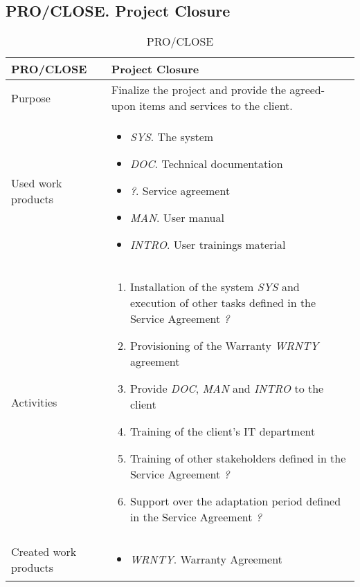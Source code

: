 \subsection{PRO/CLOSE. Project Closure}
\begin{table}[h]
\begin{tabular}{l|p{}}
\hline
\textbf{PRO/CLOSE}               & \textbf{Project Closure} \\ \hline
Purpose & Finalize the project and provide the agreed-upon items and services to the client.\\ \hline
Used work products    &      
\begin{itemize}
    \item \textit{SYS}. The system
    \item \textit{DOC}. Technical documentation
    \item \textit{?}. Service agreement
    \item \textit{MAN}. User manual
    \item \textit{INTRO}. User trainings material
\end{itemize}
\\ \hline
Activities            &   
\begin{enumerate}
 \item Installation of the system \textit{SYS} and execution of other tasks defined in the Service Agreement \textit{?}
 \item Provisioning of the Warranty \textit{WRNTY} agreement
 \item Provide \textit{DOC}, \textit{MAN} and \textit{INTRO} to the client
 \item Training of the client's IT department
 \item Training of other stakeholders defined in the Service Agreement \textit{?}
 \item Support over the adaptation period defined in the Service Agreement \textit{?}
\end{enumerate}
\\ \hline
Created work products &     
\begin{itemize}
    \item \textit{WRNTY}. Warranty Agreement
\end{itemize}
\end{tabular}
\caption{PRO/CLOSE}
\label{pro/close}
\end{table}
\newpage




